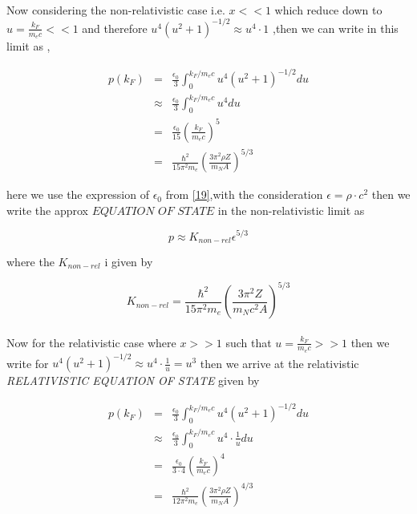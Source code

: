 \documentclass{report}
\begin{document}
\paragraph{ }
Now considering the non-relativistic case i.e. $x<<1$ which reduce down to $u= \frac{k_F}{m_ec} << 1$ and therefore $u^4(u^2+1)^{-1/2} \approx u^4\cdot 1$ ,then we can write in this limit as ,
\begin{center}
\begin{eqnarray}
p(k_F) &=& \frac{\epsilon_0}{3} \int_0 ^{k_F/m_ec} u^4(u^2+1)^{-1/2}du \nonumber \\
	&\approx & \frac{\epsilon_0}{3} \int_0 ^{k_F/m_ec} u^4 du \nonumber \\
	&=& \frac{\epsilon_0}{15} \left( \frac{k_F}{m_ec} \right)^5 \nonumber \\
	&=& \frac{\hbar ^2}{15\pi ^2 m_e}\left(\frac{3\pi^2 \rho Z}{m_NA} \right)^{5/3} 
\label{23}
\end{eqnarray}
\end{center}
 here we use the expression of  $\epsilon_0$ from \ref{19},with the consideration $\epsilon =\rho \cdot c^2$ then we write the approx $\textit{EQUATION OF STATE}$ in the non-relativistic limit as 
\begin{center}
\begin{equation}
p \approx K_{non-rel} \epsilon^{5/3}
\label{24}
\end{equation}
\end{center}
where the $K_{non-rel}$ i given by 
\begin{center}
\begin{equation}
K_{non-rel} = \frac{\hbar ^2}{15\pi ^2 m_e}\left(\frac{3\pi^2 Z}{m_N c^2 A} \right)^{5/3} 
\label{25}
\end{equation}
\end{center}
\paragraph{ }
Now for the relativistic case where $x>>1$ such that $u=\frac{k_F}{m_ec}>>1 $ then we write for $u^4(u^2+1)^{-1/2} \approx u^4\cdot \frac{1}{u} = u^3$ then we arrive at the relativistic \textit{RELATIVISTIC EQUATION OF STATE} given by
\begin{center}
\begin{eqnarray}
p(k_F) &=& \frac{\epsilon_0}{3} \int_0 ^{k_F/m_ec} u^4(u^2+1)^{-1/2}du \nonumber \\
	&\approx & \frac{\epsilon_0}{3} \int_0 ^{k_F/m_ec} u^4\cdot \frac{1}{u}du \nonumber \\
	&=&  \frac{\epsilon_0}{3\cdot 4} \left( \frac{k_F}{m_ec} \right)^4 \nonumber \\
	&=& \frac{\hbar ^2}{12\pi ^2 m_e}\left(\frac{3\pi^2 \rho Z}{m_NA} \right)^{4/3} 
\label{a}
\end{eqnarray}
\end{center}
\end{document}
